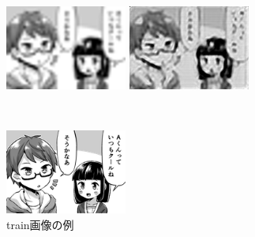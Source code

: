 \documentclass[twocolumn]{ujarticle}     %
\begin{document}
\begin{figure}[h]
      \begin{minipage}[t]{}
		\centering
		\includegraphics[width=40mm]{4scale_train.png}
      \end{minipage}  
	\begin{minipage}[t]{}
        \centering
        \includegraphics[width=40mm]{cae_train_decoded.png}
      \end{minipage} \\
      \begin{minipage}[t]{}
        \centering
        \includegraphics[width=40mm]{train_original.png}
      \end{minipage}
\caption{train画像の例\label{fig:train}}
  \end{figure}
\end{document}
